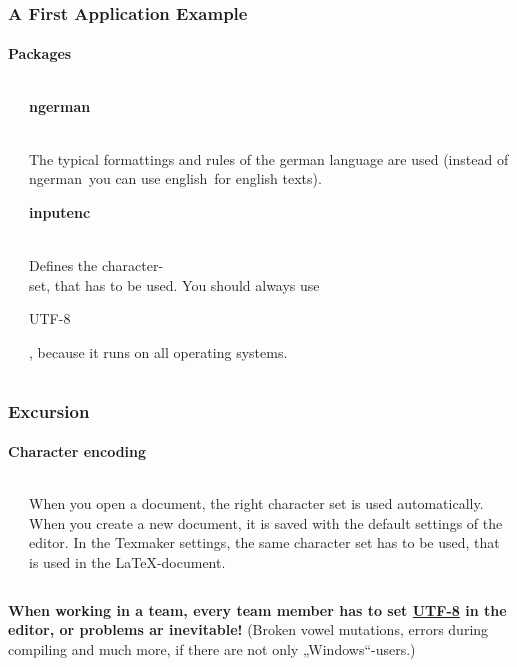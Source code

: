\begin{frame}
\frametitle{A First Application Example}
\framesubtitle{Packages}
\begin{columns}
\begin{column}{0.6\textwidth}
\begin{ttfamily}\scriptsize

 \normalsize
\end{ttfamily}
\end{column}
\begin{column}{0.4\textwidth}
\begin{ttfamily}\textbf{ngerman}\end{ttfamily}\\
The typical formattings and rules of the german language are used (instead of \grqq ngerman\grqq ~you can use \grqq english\grqq ~for english texts).\\[5mm]

\begin{ttfamily}\textbf{inputenc}\end{ttfamily}\\
Defines the character-\\set, that has to be used. You should always use
\begin{ttfamily}UTF-8\end{ttfamily}, because it runs
on all operating systems.\\
\end{column}
\end{columns}
\end{frame}

\begin{frame}
\frametitle{Excursion}
\framesubtitle{Character encoding}
\begin{columns}
\begin{column}{0.6\textwidth}

\end{column}
\begin{column}{0.4\textwidth}
When you open a document, the right character set is used automatically.
When you create a new document, it is saved with the default settings 
 of the editor. In the Texmaker settings, the same character set has to be used, that is used in the LaTeX-document.\\
\end{column}
\end{columns}
\textbf{When working in a team, every team member has to set \underline{UTF-8} in
the editor, or problems ar inevitable!} (Broken
vowel mutations, errors during compiling and much more, if there are not only „Windows“-users.)
\end{frame}

